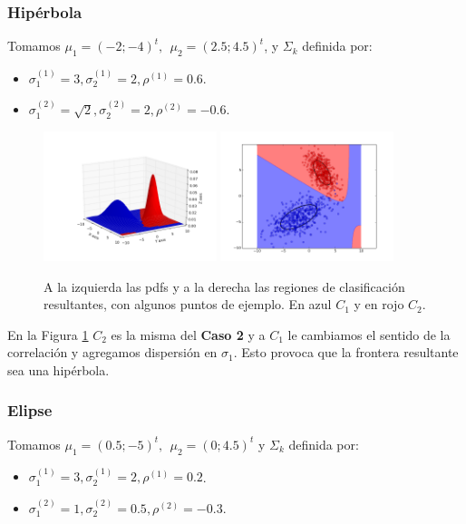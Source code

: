 \documentclass[a4paper,11pt]{article}
\begin{document}
\subsubsection*{Hipérbola}
Tomamos $\mu_1 = (-2;-4)^t, \ \ \mu_2 = (2.5; 4.5)^t$, y $\Sigma_k$ definida por:
\begin{itemize}
  \item $\sigma_1^{(1)} = 3, \sigma_2^{(1)} = 2, \rho^{(1)}=0.6 $.
  \item $\sigma_1^{(2)} = \sqrt{2}, \sigma_2^{(2)} = 2, \rho^{(2)}=-0.6 $.
\end{itemize}

\begin{figure}[h!]
\centering
\includegraphics[width=0.45\textwidth]{img/ej1-caso3a-pdf.png}
\includegraphics[width=0.45\textwidth]{img/ej1-caso3a-region.png}
\caption{A la izquierda las pdfs y a la derecha las regiones de clasificación resultantes, con algunos puntos de ejemplo. En azul $C_1$ y en rojo $C_2$.}
\label{ej1_caso3a}
\end{figure}

En la Figura \ref{ej1_caso3a} $C_2$ es la misma del {\bf Caso 2} y a $C_1$ le cambiamos el sentido de la correlación y agregamos dispersión en $\sigma_1$. Esto provoca que la frontera resultante sea una hipérbola.

\subsubsection*{Elipse}
Tomamos $\mu_1 = (0.5;-5)^t, \ \ \mu_2 = (0; 4.5)^t$ y $\Sigma_k$ definida por:
\begin{itemize}
  \item $\sigma_1^{(1)} = 3, \sigma_2^{(1)} = 2, \rho^{(1)}=0.2 $.
  \item $\sigma_1^{(2)} = 1, \sigma_2^{(2)} = 0.5, \rho^{(2)}=-0.3 $.
\end{itemize}
\end{document}
